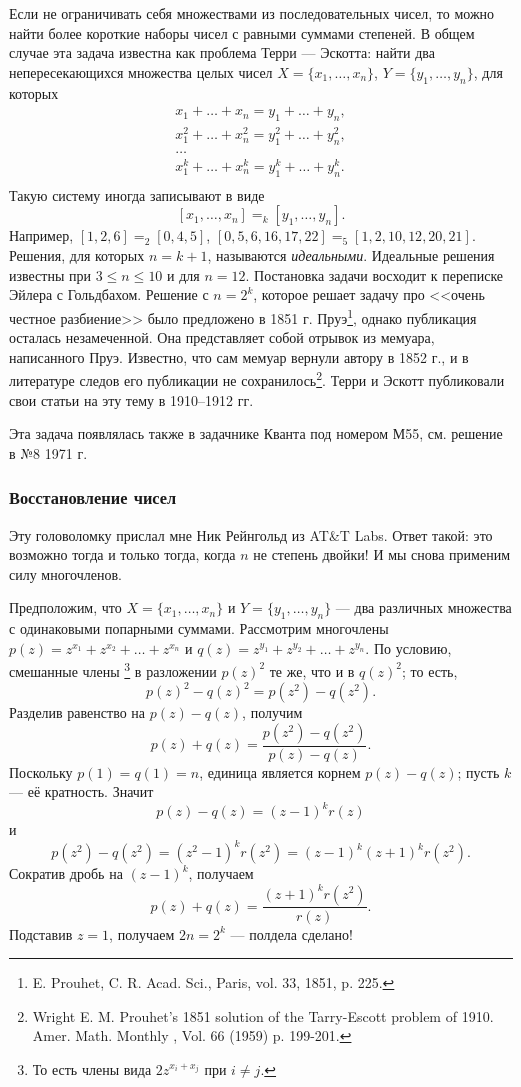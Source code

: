 \begin{addedbytheeditors}
Если не ограничивать себя множествами из последовательных чисел, то можно найти более короткие наборы чисел с равными суммами степеней.
В общем случае эта задача известна как проблема Терри --- Эскотта: найти два непересекающихся множества целых чисел $X=\{x_1,\ldots,x_n\}$, $Y=\{y_1,\ldots,y_n\}$, для которых
\begin{gather*}
    x_1+\ldots+x_n=y_1+\ldots+y_n,\\
    x_1^2+\ldots+x_n^2=y_1^2+\ldots+y_n^2,\\
    \ldots\\
    x_1^k+\ldots+x_n^k=y_1^k+\ldots+y_n^k.\\
\end{gather*}
Такую систему иногда записывают в виде $$[x_1,\ldots,x_n]=_k[y_1,\ldots,y_n].$$
Например, $[1, 2, 6] =_2 [0, 4, 5 ]$, $[  0, 5, 6, 16, 17, 22] =_5 [1, 2, 10, 12, 20, 21].$
Решения, для которых $n=k+1$, называются \textit{идеальными}.
Идеальные решения известны при $3\le n\le 10$ и для $n=12$.
Постановка задачи восходит к переписке Эйлера с Гольдбахом.
Решение с $n=2^k$, которое решает задачу про <<очень честное разбиение>> было предложено в 1851 г. Пруэ\footnote{E. Prouhet, C. R. Acad. Sci., Paris, vol. 33, 1851, p. 225.}, однако публикация осталась незамеченной.
Она представляет собой отрывок из мемуара, написанного Пруэ.
Известно, что сам мемуар вернули автору в 1852 г., и в литературе следов его публикации не сохранилось\footnote{Wright E. M. 
Prouhet's 1851 solution of the Tarry-Escott problem of 1910. 
Amer. Math. Monthly , Vol. 66 (1959)
p. 199-201.}. Терри и Эскотт публиковали свои статьи на эту тему в 1910--1912 гг.

Эта задача появлялась также в задачнике Кванта под номером М55, см. решение в №8 1971 г.
\pr
\end{addedbytheeditors}

\subsubsection*{Восстановление чисел}

Эту головоломку прислал мне Ник Рейнгольд из AT\&T Labs.
Ответ такой: это возможно тогда и только тогда, когда $n$ не степень двойки!
И мы снова применим силу многочленов.

Предположим, что $X = \{x_1 , \dots , x_n\}$ и $Y = \{y_1 , \dots , y_n\}$ --- два различных множества с одинаковыми попарными суммами.
Рассмотрим многочлены
$p(z)=z^{x_1} + z^{x_2} + \dots + z^{x_n}$
и 
$q(z)=z^{y_1} + z^{y_2} + \dots + z^{y_n}$.
По условию, смешанные члены%
\footnote{То есть члены вида $2z^{x_i+x_j}$ при $i\ne j$.} в разложении $p(z)^2$ те же, что и в $q(z)^2$;
то есть,
\[p(z)^2 -q(z)^2 = p(z^2 )-q(z^2).\]
Разделив равенство на $p(z) - q(z)$, получим
\[p(z) + q(z) =
\frac{p(z^2 ) - q(z^2 )}{p(z) - q(z)}.
\]
Поскольку $p(1) = q(1) = n$,
единица является корнем $p(z) - q(z)$; пусть $k$ --- её кратность.
Значит
\[p(z) - q(z) = (z - 1)^k r(z)\]
и
\[p(z^2 ) - q(z^2 ) = (z^2 - 1)^k r(z^2 )= (z - 1)^k (z + 1)^k r(z^2).\]
Сократив дробь на $(z - 1)^k$, получаем
\[p(z) + q(z) =
\frac{(z + 1)^k r(z^2)}{r(z)}.
\]
Подставив $z = 1$, получаем $2n = 2^k$ --- полдела сделано!

